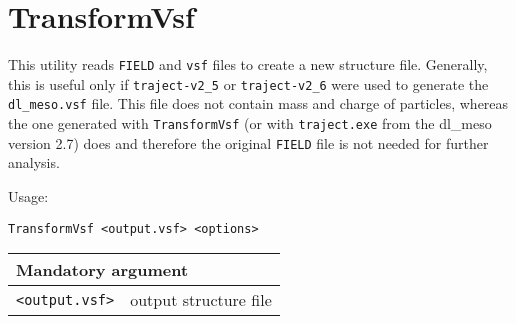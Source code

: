 \section{TransformVsf} \label{sec:TransformVsf}

This utility reads \texttt{FIELD} and \texttt{vsf} files to create a new
structure file. Generally, this is useful only if \texttt{traject-v2\_5} or
\texttt{traject-v2\_6} were used to generate the \texttt{dl\_meso.vsf}
file. This file does not contain mass and charge of particles, whereas the
one generated with \texttt{TransformVsf} (or with \texttt{traject.exe} from
the dl\_meso version 2.7) does and therefore the original \texttt{FIELD}
file is not needed for further analysis.

Usage:

\vspace{1em}
\noindent
\texttt{TransformVsf <output.vsf> <options>}

\vspace{1em}
\noindent
\begin{longtable}{p{}p{}}
  \toprule
  \multicolumn{2}{l}{Mandatory argument} \\
  \midrule
  \texttt{<output.vsf>} & output structure file \\
  \bottomrule
\end{longtable}
